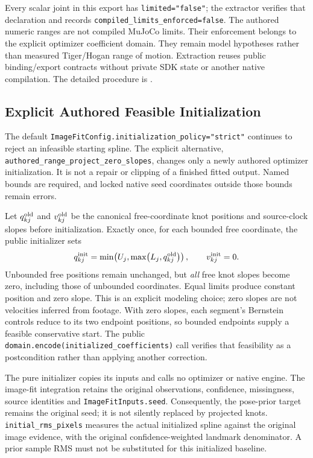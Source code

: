 \documentclass[11pt,letterpaper]{article}
\newcommand{\code}[1]{\nolinkurl{#1}}
\begin{document}
Every scalar joint in this export has \code{limited="false"}; the extractor verifies that
declaration and records \code{compiled_limits_enforced=false}. The authored numeric ranges are
not compiled MuJoCo limits. Their enforcement belongs to the explicit optimizer coefficient
domain. They remain model hypotheses rather than measured Tiger/Hogan range of motion.
Extraction reuses public binding/export contracts without private SDK state or another native
compilation. The detailed procedure is .

\subsection{Explicit Authored Feasible Initialization}
The default \code{ImageFitConfig.initialization_policy="strict"} continues to
reject an infeasible starting spline. The explicit alternative,
\code{authored_range_project_zero_slopes}, changes only a newly authored
optimizer initialization. It is not a repair or clipping of a finished fitted
output. Named bounds are required, and locked native seed coordinates outside
those bounds remain errors.

Let $q_{kj}^{\rm old}$ and $v_{kj}^{\rm old}$ be the canonical free-coordinate
knot positions and source-clock slopes before initialization. Exactly once,
for each bounded free coordinate, the public initializer sets
\begin{equation}
 q_{kj}^{\rm init}=\min\!\left(U_j,
                   \max\!\left(L_j,q_{kj}^{\rm old}\right)\right),\qquad
 v_{kj}^{\rm init}=0.
\end{equation}
Unbounded free positions remain unchanged, but \emph{all} free knot slopes
become zero, including those of unbounded coordinates. Equal limits produce
constant position and zero slope. This is an explicit modeling choice; zero
slopes are not velocities inferred from footage. With zero slopes, each
segment's Bernstein controls reduce to its two endpoint positions, so bounded
endpoints supply a feasible conservative start. The public
\code{domain.encode(initialized_coefficients)} call verifies that feasibility
as a postcondition rather than applying another correction.

The pure initializer copies its inputs and calls no optimizer or native engine. The image-fit
integration retains the original observations, confidence, missingness, source identities and
\mbox{\code{ImageFitInputs.seed}}. Consequently, the pose-prior target remains the original seed; it
is not silently replaced by projected knots. \code{initial_rms_pixels} measures the actual
initialized spline against the original image evidence, with the original confidence-weighted
landmark denominator. A prior sample RMS must not be substituted for this initialized baseline.
\end{document}
